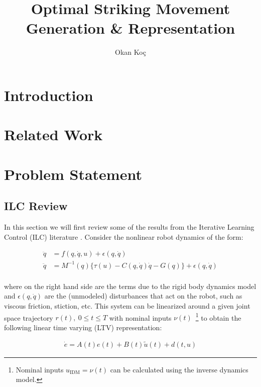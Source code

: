 \documentclass[10pt,a4paper]{article}
\author{Okan Ko\c c}
\title{Optimal Striking Movement Generation \& Representation}
\newcommand{\joint}{q} %
\newcommand{\error}{e} %
\newcommand{\traj}{r} %
\newcommand{\dist}{\epsilon} %
\newcommand{\linDist}{d} %
\newcommand{\sysInput}{u} %
\newcommand{\linInput}{\tilde{u}} %
\newcommand{\dynamics}{f}
\begin{document}
\maketitle

\section{Introduction}

\section{Related Work}

\section{Problem Statement}

\subsection{ILC Review}

In this section we will first review some of the results from the Iterative Learning Control (ILC) literature \cite{Bristow06}. Consider the nonlinear robot dynamics of the form:

\begin{equation}
\begin{aligned}
\ddot{\joint} &= \dynamics(\joint,\dot{\joint},\sysInput) + \dist(\joint,\dot{\joint})\\
\ddot{\joint} &= M^{-1}(\joint)\{ \tau(\sysInput) - C(\joint,\dot{\joint})\dot{\joint} - G(\joint)\} + \dist(\joint,\dot{\joint})\\
\end{aligned}
\label{dynamics}
\end{equation}

where on the right hand side are the terms due to the rigid body dynamics model and $\dist(\joint,\dot{\joint})$ are the (unmodeled) disturbances that act on the robot, such as viscous friction, stiction, etc. This system can be linearized around a given joint space trajectory $\traj(t), \ 0 \leq t \leq T$ with nominal inputs $\nu(t)$~\footnote{Nominal inputs $\sysInput_{\text{IDM}} = \nu(t)$ can be calculated using the inverse dynamics model.} to obtain the following linear time varying (LTV) representation:

\begin{equation}
\begin{aligned}
\dot{\error} = A(t)\error(t) + B(t)\linInput(t) + \linDist(t,\sysInput)
\end{aligned}
\label{LTV}
\end{equation}
\end{document}
